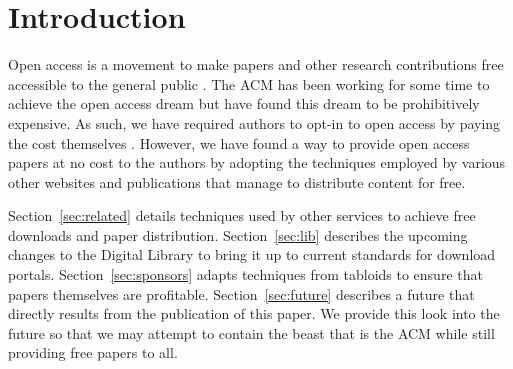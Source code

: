 \section{Introduction}
Open access is a movement to make papers and other research contributions free
accessible to the general public \cite{oa}.
The ACM has been working for some time to achieve the open access dream but
have found this dream to be prohibitively expensive.
As such, we have required authors to opt-in to open access by paying the cost
themselves .
However, we have found a way to provide open access papers at no cost to the
authors by adopting the techniques employed by various other websites and
publications that manage to distribute content for free.

Section~\ref{sec:related} details techniques used by other services to achieve free
downloads and paper distribution.
Section~\ref{sec:lib} describes the upcoming changes to the Digital Library to
bring it up to current standards for download portals.
Section~\ref{sec:sponsors} adapts techniques from tabloids to ensure that papers
themselves are profitable.
Section~\ref{sec:future} describes a future that directly results from the
publication of this paper.
We provide this look into the future so that we may attempt to contain the
beast that is the ACM while still providing free papers to all.
